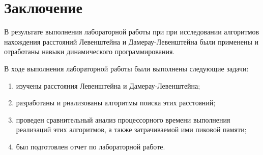 \chapter*{Заключение}

В результате выполнения лабораторной работы при при исследовании алгоритмов нахождения расстояний Левенштейна и Дамерау-Левенштейна были применены и отработаны навыки динамического программирования.

В ходе выполнения лабораторной работы были выполнены следующие задачи: 
\begin{enumerate}[label={\arabic*)}]
	\item изучены расстояния Левенштейна и Дамерау-Левенштейна;
	\item разработаны и рнализованы алгоритмы поиска этих расстояний;
	\item проведен сравнительный анализ процессорного времени выполнения реализаций этих алгоритмов, а также затрачиваемой ими пиковой памяти;
	\item был подготовлен отчет по лабораторной работе.
\end{enumerate}

